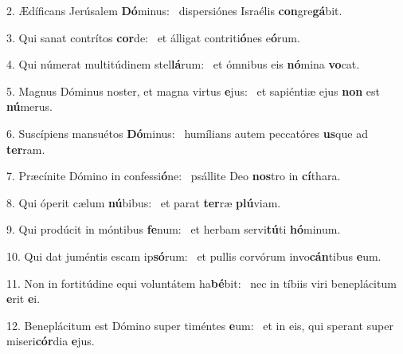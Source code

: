 2. Ædíficans Jerúsalem \textbf{Dó}minus: \ast\  dispersiónes Israélis \textbf{con}gre\textbf{gá}bit.\

3. Qui sanat contrítos \textbf{cor}de: \ast\  et álligat contriti\textbf{ó}nes e\textbf{ó}rum.\

4. Qui númerat multitúdinem stel\textbf{lá}rum: \ast\  et ómnibus eis \textbf{nó}mina \textbf{vo}cat.\

5. Magnus Dóminus noster, et magna virtus \textbf{e}jus: \ast\  et sapiéntiæ ejus \textbf{non} est \textbf{nú}merus.\

6. Suscípiens mansuétos \textbf{Dó}minus: \ast\  humílians autem peccatóres \textbf{us}que ad \textbf{ter}ram.\

7. Præcínite Dómino in confessi\textbf{ó}ne: \ast\  psállite Deo \textbf{nos}tro in \textbf{cí}thara.\

8. Qui óperit cælum \textbf{nú}bibus: \ast\  et parat \textbf{ter}ræ \textbf{plú}viam.\

9. Qui prodúcit in móntibus \textbf{fe}num: \ast\  et herbam servi\textbf{tú}ti \textbf{hó}minum.\

10. Qui dat juméntis escam ip\textbf{só}rum: \ast\  et pullis corvórum invo\textbf{cán}tibus \textbf{e}um.\

11. Non in fortitúdine equi voluntátem ha\textbf{bé}bit: \ast\  nec in tíbiis viri beneplácitum \textbf{e}rit \textbf{e}i.\

12. Beneplácitum est Dómino super timéntes \textbf{e}um: \ast\  et in eis, qui sperant super miseri\textbf{cór}dia \textbf{e}jus.\

